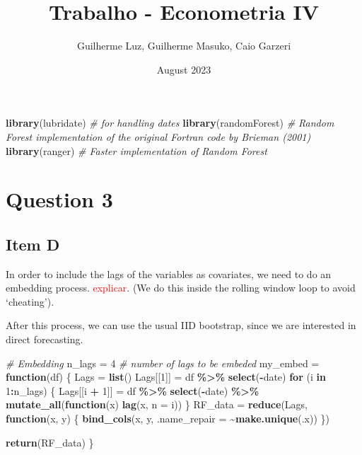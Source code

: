 \documentclass[
]{article}
\title{Trabalho - Econometria IV}
\author{Guilherme Luz, Guilherme Masuko, Caio Garzeri}
\date{August 2023}
\newenvironment{Shaded}{\begin{snugshade}}{\end{snugshade}}
\newcommand{\AttributeTok}[1]{\textcolor[rgb]{0.13,0.29,0.53}{#1}}
\newcommand{\CommentTok}[1]{\textcolor[rgb]{0.56,0.35,0.01}{\textit{#1}}}
\newcommand{\ControlFlowTok}[1]{\textcolor[rgb]{0.13,0.29,0.53}{\textbf{#1}}}
\newcommand{\DecValTok}[1]{\textcolor[rgb]{0.00,0.00,0.81}{#1}}
\newcommand{\FunctionTok}[1]{\textcolor[rgb]{0.13,0.29,0.53}{\textbf{#1}}}
\newcommand{\NormalTok}[1]{#1}
\newcommand{\OtherTok}[1]{\textcolor[rgb]{0.56,0.35,0.01}{#1}}
\newcommand{\SpecialCharTok}[1]{\textcolor[rgb]{0.81,0.36,0.00}{\textbf{#1}}}
\begin{document}
\maketitle

\begin{Shaded}
\begin{Highlighting}[]
\FunctionTok{library}\NormalTok{(lubridate)  }\CommentTok{\# for handling dates}
\FunctionTok{library}\NormalTok{(randomForest)  }\CommentTok{\# Random Forest implementation of the original Fortran code by Brieman (2001)}
\FunctionTok{library}\NormalTok{(ranger)  }\CommentTok{\# Faster implementation of Random Forest}
\end{Highlighting}
\end{Shaded}

\hypertarget{question-3}{%
\section{Question 3}\label{question-3}}

\hypertarget{item-d}{%
\subsection{Item D}\label{item-d}}

In order to include the lags of the variables as covariates, we need to
do an embedding process. \textcolor{red}{explicar}. (We do this inside
the rolling window loop to avoid `cheating').

After this process, we can use the usual IID bootstrap, since we are
interested in direct forecasting.

\begin{Shaded}
\begin{Highlighting}[]
\CommentTok{\# Embedding}
\NormalTok{n\_lags }\OtherTok{=} \DecValTok{4}  \CommentTok{\# number of lags to be embeded}
\NormalTok{my\_embed }\OtherTok{=} \ControlFlowTok{function}\NormalTok{(df) \{}
\NormalTok{    Lags }\OtherTok{=} \FunctionTok{list}\NormalTok{()}
\NormalTok{    Lags[[}\DecValTok{1}\NormalTok{]] }\OtherTok{=}\NormalTok{ df }\SpecialCharTok{\%\textgreater{}\%}
        \FunctionTok{select}\NormalTok{(}\SpecialCharTok{{-}}\NormalTok{date)}
    \ControlFlowTok{for}\NormalTok{ (i }\ControlFlowTok{in} \DecValTok{1}\SpecialCharTok{:}\NormalTok{n\_lags) \{}
\NormalTok{        Lags[[i }\SpecialCharTok{+} \DecValTok{1}\NormalTok{]] }\OtherTok{=}\NormalTok{ df }\SpecialCharTok{\%\textgreater{}\%}
            \FunctionTok{select}\NormalTok{(}\SpecialCharTok{{-}}\NormalTok{date) }\SpecialCharTok{\%\textgreater{}\%}
            \FunctionTok{mutate\_all}\NormalTok{(}\ControlFlowTok{function}\NormalTok{(x) }\FunctionTok{lag}\NormalTok{(x, }\AttributeTok{n =}\NormalTok{ i))}
\NormalTok{    \}}
\NormalTok{    RF\_data }\OtherTok{=} \FunctionTok{reduce}\NormalTok{(Lags, }\ControlFlowTok{function}\NormalTok{(x, y) \{}
        \FunctionTok{bind\_cols}\NormalTok{(x, y, }\AttributeTok{.name\_repair =} \SpecialCharTok{\textasciitilde{}}\FunctionTok{make.unique}\NormalTok{(.x))}
\NormalTok{    \})}

    \FunctionTok{return}\NormalTok{(RF\_data)}
\NormalTok{\}}
\end{Highlighting}
\end{Shaded}
\end{document}
